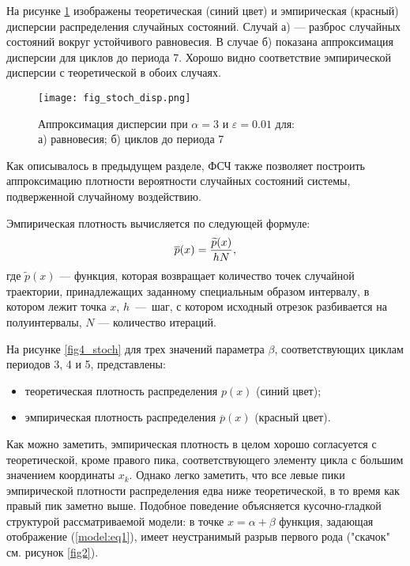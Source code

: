\documentclass[a4paper, 14pt]{extreport}
\numberwithin{equation}{section}
\numberwithin{figure}{section}
\numberwithin{table}{section}
\begin{document}
				На рисунке \ref{fig_stoch_disp} изображены теоретическая (синий цвет) и эмпирическая (красный) дисперсии распределения случайных состояний. Случай а) --- разброс случайных состояний вокруг устойчивого равновесия. В случае б) показана аппроксимация дисперсии для циклов до периода 7. Хорошо видно соответствие эмпирической дисперсии с теоретической в обоих случаях.	
				\begin{figure}[h!]
					\begin{center}
						\texttt{[image: fig\_stoch\_disp.png]}
					\end{center}
					\caption{Аппроксимация дисперсии при $ \alpha = 3 $ и $ \varepsilon = 0.01 $ для: \\а) равновесия; б) циклов до периода 7}
					\label{fig_stoch_disp}		
				\end{figure}

				Как описывалось в предыдущем разделе, ФСЧ также позволяет построить аппроксимацию плотности вероятности случайных состояний системы, подверженной случайному воздействию. %

				Эмпирическая плотность вычисляется по следующей формуле:
				\begin{equation}
					\overline{p}(x) = \frac{\widetilde{p}(x)}{h N}, \\[1mm]
				\end{equation}
				где $ \widetilde{p}(x) $ --- функция, которая возвращает количество точек случайной траектории, принадлежащих заданному специальным образом интервалу, в котором лежит точка $ x $, $ h $~---~шаг, с котором исходный отрезок разбивается на полуинтервалы, $ N $ --- количество итераций. %

                На рисунке \ref{fig4_stoch} для трех значений параметра $ \beta $, соответствующих циклам периодов 3, 4 и 5, представлены:
                \begin{itemize}
                	\item теоретическая плотность распределения $ p(x) $ (синий цвет);
                    \item эмпирическая плотность распределения $ \overline{p}(x) $ (красный цвет).
                \end{itemize} %

                Как можно заметить, эмпирическая плотность в целом хорошо согласуется с теоретической, кроме правого пика, соответствующего элементу цикла с б$\acute{о}$льшим значением координаты $ x_{k} $. Однако легко заметить, что все левые пики эмпирической плотности распределения едва ниже теоретической, в то время как правый пик заметно выше. Подобное поведение объясняется кусочно-гладкой структурой рассматриваемой модели: в точке $ x = \alpha + \beta $ функция, задающая отображение (\ref{model:eq1}), имеет неустранимый разрыв первого рода ("скачок" см. рисунок \ref{fig2}). %
\end{document}
